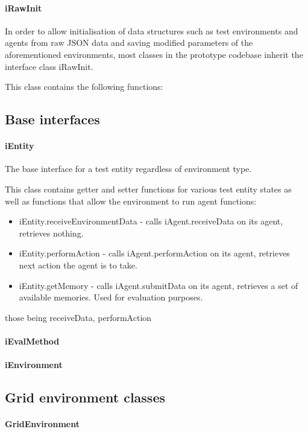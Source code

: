 \documentclass[masterthesis]{fer}
\begin{document}
\paragraph{iRawInit}
In order to allow initialisation of data structures such as test environments and agents from raw JSON data and saving modified parameters of the aforementioned environments,
most classes in the prototype codebase inherit the interface class iRawInit.

This class contains the following functions:

\subsection{Base interfaces}
\paragraph{iEntity}
The base interface for a test entity regardless of environment type.

This class contains getter and setter functions for various test entity states
as well as functions that allow the environment to run agent functions:
\begin{itemize}
\item{iEntity.receiveEnvironmentData} - calls iAgent.receiveData on its agent, retrieves nothing.
\item{iEntity.performAction} - calls iAgent.performAction on its agent, retrieves next action the agent is to take.
\item{iEntity.getMemory} - calls iAgent.submitData on its agent, retrieves a set of available memories. Used for evaluation purposes.
\end{itemize}
those being receiveData, performAction
\paragraph{iEvalMethod}
\paragraph{iEnvironment}
\subsection{Grid environment classes}
\paragraph{GridEnvironment}
\end{document}
